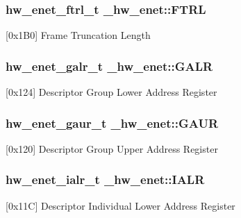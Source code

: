 \subsubsection[{\texorpdfstring{F\+T\+RL}{FTRL}}]{ {\bf hw\+\_\+enet\+\_\+ftrl\+\_\+t} \+\_\+hw\+\_\+enet\+::\+F\+T\+RL}\hypertarget{struct__hw__enet_afa7c8b138113934f2c80638d3e230ccd}{}\label{struct__hw__enet_afa7c8b138113934f2c80638d3e230ccd}
\mbox{[}0x1\+B0\mbox{]} Frame Truncation Length 
\subsubsection[{\texorpdfstring{G\+A\+LR}{GALR}}]{ {\bf hw\+\_\+enet\+\_\+galr\+\_\+t} \+\_\+hw\+\_\+enet\+::\+G\+A\+LR}\hypertarget{struct__hw__enet_a7ec398786236d6bcbfdbff2fd71b319c}{}\label{struct__hw__enet_a7ec398786236d6bcbfdbff2fd71b319c}
\mbox{[}0x124\mbox{]} Descriptor Group Lower Address Register 
\subsubsection[{\texorpdfstring{G\+A\+UR}{GAUR}}]{ {\bf hw\+\_\+enet\+\_\+gaur\+\_\+t} \+\_\+hw\+\_\+enet\+::\+G\+A\+UR}\hypertarget{struct__hw__enet_a6ffea4c3cb08e1b799de2f2678a7a734}{}\label{struct__hw__enet_a6ffea4c3cb08e1b799de2f2678a7a734}
\mbox{[}0x120\mbox{]} Descriptor Group Upper Address Register 
\subsubsection[{\texorpdfstring{I\+A\+LR}{IALR}}]{ {\bf hw\+\_\+enet\+\_\+ialr\+\_\+t} \+\_\+hw\+\_\+enet\+::\+I\+A\+LR}\hypertarget{struct__hw__enet_a1d8342f193e4df2411cc774cc571ea2f}{}\label{struct__hw__enet_a1d8342f193e4df2411cc774cc571ea2f}
\mbox{[}0x11C\mbox{]} Descriptor Individual Lower Address Register 
